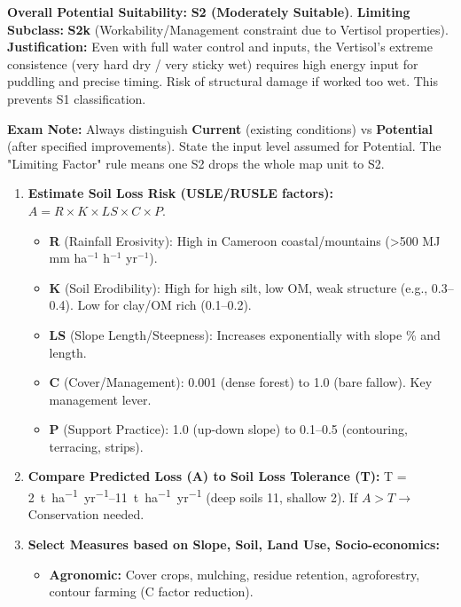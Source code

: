 \documentclass[11pt]{article}
\begin{document}
\begin{exoresolu}
\noindent\textbf{Overall Potential Suitability:} \textbf{S2 (Moderately Suitable)}.
\textbf{Limiting Subclass:} \textbf{S2k} (Workability/Management constraint due to Vertisol properties).
\textbf{Justification:} Even with full water control and inputs, the Vertisol's extreme consistence (very hard dry / very sticky wet) requires high energy input for puddling and precise timing. Risk of structural damage if worked too wet. This prevents S1 classification.

\noindent\textbf{Exam Note:} Always distinguish \textbf{Current} (existing conditions) vs \textbf{Potential} (after specified improvements). State the input level assumed for Potential. The "Limiting Factor" rule means one S2 drops the whole map unit to S2.
\end{exoresolu}

\begin{methode}
\begin{enumerate}
\item \textbf{Estimate Soil Loss Risk (USLE/RUSLE factors):} $A = R \times K \times LS \times C \times P$.
      \begin{itemize}
      \item \textbf{R} (Rainfall Erosivity): High in Cameroon coastal/mountains (\textgreater 500 MJ mm ha$^{-1}$ h$^{-1}$ yr$^{-1}$).
      \item \textbf{K} (Soil Erodibility): High for high silt, low OM, weak structure (e.g., 0.3--0.4). Low for clay/OM rich (0.1--0.2).
      \item \textbf{LS} (Slope Length/Steepness): Increases exponentially with slope \% and length.
      \item \textbf{C} (Cover/Management): 0.001 (dense forest) to 1.0 (bare fallow). Key management lever.
      \item \textbf{P} (Support Practice): 1.0 (up-down slope) to 0.1--0.5 (contouring, terracing, strips).
      \end{itemize}
\item \textbf{Compare Predicted Loss (A) to Soil Loss Tolerance (T):} T = \SIrange{2}{11}{t.ha^{-1}.yr^{-1}} (deep soils \num{11}, shallow \num{2}). If $A > T \rightarrow$ Conservation needed.
\item \textbf{Select Measures based on Slope, Soil, Land Use, Socio-economics:}
      \begin{itemize}
      \item \textbf{Agronomic:} Cover crops, mulching, residue retention, agroforestry, contour farming (C factor reduction).

\end{itemize}
\end{enumerate}
\end{methode}
\end{document}
